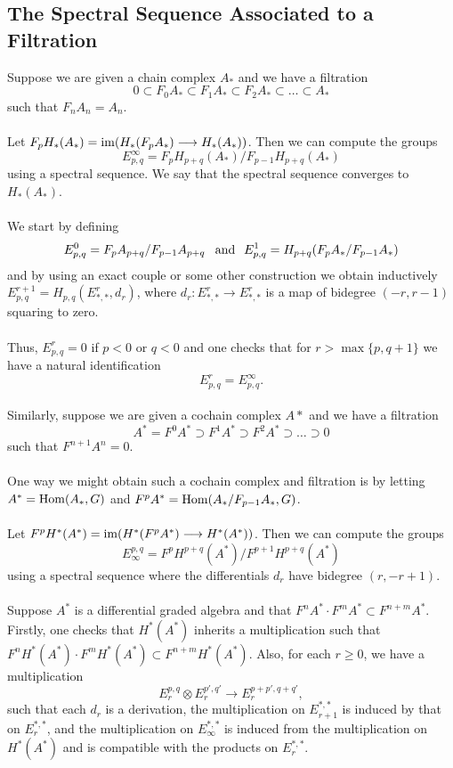 \documentclass[11pt]{article}
\begin{document}
\begin{Jandr SSS notes}
	\subsection{The Spectral Sequence Associated to a Filtration}
Suppose we are given a chain complex $A_*$ and we have a filtration
\[0\subset F_0 A_*\subset F_1 A_*\subset F_2 A_*\subset\ldots\subset A_*\]
such that $F_n A_n=A_n$.\\
\\
Let $F_p H_*(A_*)=\operatorname{im}(H_*(F_p A_*)\longrightarrow H_*(A_*))$. Then we can compute the groups
\[E^{\infty}_{p,q}=F_p H_{p+q}(A_*)/F_{p-1} H_{p+q}(A_*)\]
using a spectral sequence. We say that the spectral sequence converges to $H_*(A_*)$.\\
\\
We start by defining
\[E^0_{p,q}=F_p A_{p+q}/F_{p-1} A_{p+q}\hspace{8pt}\textup{and}\hspace{7pt}
E^1_{p,q}=H_{p+q}(F_p A_*/F_{p-1} A_*)\]
and by using an exact couple or some other construction we obtain inductively $E^{r+1}_{p,q}=H_{p,q}(E^r_{*,*},d_r)$, where $d_r:E^r_{*,*}\to E^r_{*,*}$ is a map of bidegree $(-r,r-1)$ squaring to zero.\\
\\
Thus, $E^r_{p,q}=0$ if $p<0$ or $q<0$ and one checks that for $r>\max\{p,q+1\}$ we have a natural identification
\[E^r_{p,q}=E^{\infty}_{p,q}.\]
\\
Similarly, suppose we are given a cochain complex $A*$ and we have a filtration
\[A^*=F^0 A^*\supset F^1 A^*\supset F^2 A^*\supset\ldots\supset 0\]
such that $F^{n+1}A^n=0$.\\
\\
One way we might obtain such a cochain complex and filtration is by letting $A^*=\operatorname{Hom}(A_*,G)$ and $F^p A^*=\operatorname{Hom}(A_*/F_{p-1}A_*,G)$.\\
\\
Let $F^p H^*(A^*)=\operatorname{im}(H^*(F^p A^*)\longrightarrow H^*(A^*))$. Then we can compute the groups
\[E_{\infty}^{p,q}=F^p H^{p+q}(A^*)/F^{p+1} H^{p+q}(A^*)\]
using a spectral sequence where the differentials $d_r$ have bidegree $(r,-r+1)$.\\
\\
Suppose $A^*$ is a differential graded algebra and that $F^n A^*\cdot F^m A^*\subset F^{n+m}A^*$. Firstly, one checks that $H^*(A^*)$ inherits a multiplication such that $F^n H^*(A^*)\cdot F^m H^*(A^*)\subset F^{n+m}H^*(A^*)$. Also, for each $r\geq 0$, we have a multiplication
\[E_r^{p,q}\otimes E_r^{p',q'}\to E_r^{p+p',q+q'},\]
such that each $d_r$ is a derivation, the multiplication on $E_{r+1}^{*,*}$ is induced by that on $E_r^{*,*}$, and the multiplication on $E_{\infty}^{*,*}$ is induced from the multiplication on $H^*(A^*)$ and is compatible with the products on $E_r^{*,*}$.



\end{Jandr SSS notes}
\end{document}
